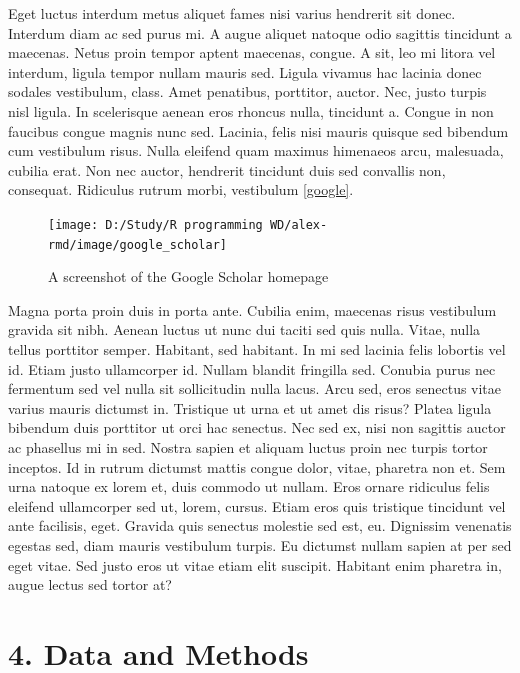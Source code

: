 \documentclass[
]{article}
\begin{document}
Eget luctus interdum metus aliquet fames nisi varius hendrerit sit
donec. Interdum diam ac sed purus mi. A augue aliquet natoque odio
sagittis tincidunt a maecenas. Netus proin tempor aptent maecenas,
congue. A sit, leo mi litora vel interdum, ligula tempor nullam mauris
sed. Ligula vivamus hac lacinia donec sodales vestibulum, class. Amet
penatibus, porttitor, auctor. Nec, justo turpis nisl ligula. In
scelerisque aenean eros rhoncus nulla, tincidunt a. Congue in non
faucibus congue magnis nunc sed. Lacinia, felis nisi mauris quisque sed
bibendum cum vestibulum risus. Nulla eleifend quam maximus himenaeos
arcu, malesuada, cubilia erat. Non nec auctor, hendrerit tincidunt duis
sed convallis non, consequat. Ridiculus rutrum morbi, vestibulum
\autoref{google}.

\begin{figure}

{\centering \texttt{[image: D:/Study/R programming WD/alex-rmd/image/google\_scholar]} 

}

\caption{A screenshot of the Google Scholar homepage \label{google}}\label{fig:screenshot}
\end{figure}

Magna porta proin duis in porta ante. Cubilia enim, maecenas risus
vestibulum gravida sit nibh. Aenean luctus ut nunc dui taciti sed quis
nulla. Vitae, nulla tellus porttitor semper. Habitant, sed habitant. In
mi sed lacinia felis lobortis vel id. Etiam justo ullamcorper id. Nullam
blandit fringilla sed. Conubia purus nec fermentum sed vel nulla sit
sollicitudin nulla lacus. Arcu sed, eros senectus vitae varius mauris
dictumst in. Tristique ut urna et ut amet dis risus? Platea ligula
bibendum duis porttitor ut orci hac senectus. Nec sed ex, nisi non
sagittis auctor ac phasellus mi in sed. Nostra sapien et aliquam luctus
proin nec turpis tortor inceptos. Id in rutrum dictumst mattis congue
dolor, vitae, pharetra non et. Sem urna natoque ex lorem et, duis
commodo ut nullam. Eros ornare ridiculus felis eleifend ullamcorper sed
ut, lorem, cursus. Etiam eros quis tristique tincidunt vel ante
facilisis, eget. Gravida quis senectus molestie sed est, eu. Dignissim
venenatis egestas sed, diam mauris vestibulum turpis. Eu dictumst nullam
sapien at per sed eget vitae. Sed justo eros ut vitae etiam elit
suscipit. Habitant enim pharetra in, augue lectus sed tortor at?

\hypertarget{data-and-methods}{%
\section{4. Data and Methods}\label{data-and-methods}}
\end{document}
